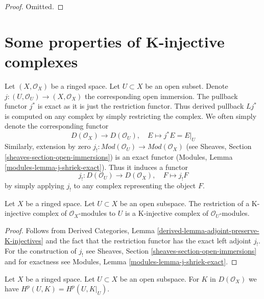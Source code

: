 \begin{proof}
Omitted.
\end{proof}














\section{Some properties of K-injective complexes}
\label{section-properties-K-injective}

\noindent
Let $(X, \mathcal{O}_X)$ be a ringed space. Let $U \subset X$ be an
open subset. Denote $j : (U, \mathcal{O}_U) \to (X, \mathcal{O}_X)$
the corresponding open immersion. The pullback functor $j^*$ is exact
as it is just the restriction functor. Thus derived pullback $Lj^*$ is
computed on any complex by simply restricting the complex. We often
simply denote the corresponding functor
$$
D(\mathcal{O}_X) \to D(\mathcal{O}_U),
\quad
E \mapsto j^*E = E|_U
$$
Similarly, extension by zero
$j_! : \textit{Mod}(\mathcal{O}_U) \to \textit{Mod}(\mathcal{O}_X)$
(see Sheaves, Section \ref{sheaves-section-open-immersions})
is an exact functor (Modules, Lemma \ref{modules-lemma-j-shriek-exact}).
Thus it induces a functor
$$
j_! : D(\mathcal{O}_U) \to D(\mathcal{O}_X),\quad
F \mapsto j_!F
$$
by simply applying $j_!$ to any complex representing the object $F$.

\begin{lemma}
\label{lemma-restrict-K-injective-to-open}
Let $X$ be a ringed space. Let $U \subset X$ be an open subspace.
The restriction of a K-injective complex of $\mathcal{O}_X$-modules
to $U$ is a K-injective complex of $\mathcal{O}_U$-modules.
\end{lemma}

\begin{proof}
Follows from
Derived Categories, Lemma \ref{derived-lemma-adjoint-preserve-K-injectives}
and the fact that the restriction functor has the
exact left adjoint $j_!$.
For the construction of $j_!$ see
Sheaves, Section \ref{sheaves-section-open-immersions}
and for exactness see Modules, Lemma \ref{modules-lemma-j-shriek-exact}.
\end{proof}

\begin{lemma}
\label{lemma-unbounded-cohomology-of-open}
Let $X$ be a ringed space. Let $U \subset X$ be an open subspace.
For $K$ in $D(\mathcal{O}_X)$ we have
$H^p(U, K) = H^p(U, K|_U)$.
\end{lemma}

